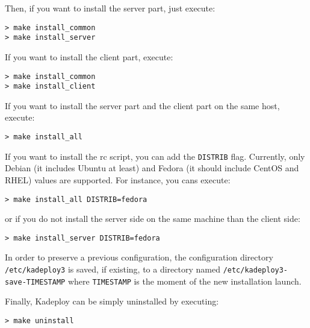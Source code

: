 \documentclass[a4wide,10pt,oneside]{book}
\begin{document}
\noindent Then, if you want to install the server part, just execute:
\begin{small}
\begin{verbatim}
> make install_common
> make install_server
\end{verbatim}
\end{small}

\noindent If you want to install the client part, execute:
\begin{small}
\begin{verbatim}
> make install_common
> make install_client
\end{verbatim}
\end{small}

\noindent If you want to install the server part and the client part on the same host, execute:
\begin{small}
\begin{verbatim}
> make install_all
\end{verbatim}
\end{small}

\noindent If you want to install the rc script, you can add the \texttt{DISTRIB} flag. Currently, only Debian (it includes Ubuntu at least) and Fedora (it should include CentOS and RHEL) values are supported. For instance, you cans execute:
\begin{small}
\begin{verbatim}
> make install_all DISTRIB=fedora
\end{verbatim}
\end{small}
or if you do not install the server side on the same machine than the client side:
\begin{small}
\begin{verbatim}
> make install_server DISTRIB=fedora
\end{verbatim}
\end{small}

\noindent In order to preserve a previous configuration, the configuration directory \texttt{/etc/kadeploy3} is saved, if existing, to a directory named \texttt{/etc/kadeploy3-save-TIMESTAMP} where \texttt{TIMESTAMP} is the moment of the new installation launch.

\noindent Finally, Kadeploy can be simply uninstalled by executing:
\begin{small}
\begin{verbatim}
> make uninstall
\end{verbatim}
\end{small}
\end{document}
